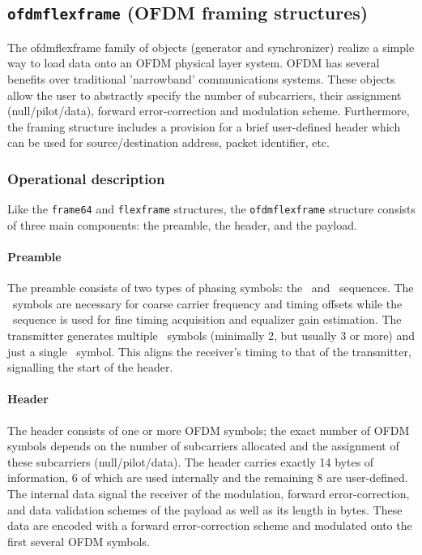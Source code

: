 % 
%
\subsection{{\tt ofdmflexframe} (OFDM framing structures)}
\label{module:framing:ofdmflexframe}

The ofdmflexframe family of objects (generator and synchronizer)
realize a simple way to load data onto an OFDM physical layer
system. OFDM has several benefits over traditional 'narrowband'
communications systems.
These objects allow the user to abstractly specify the number of
subcarriers, their assignment (null/pilot/data), forward
error-correction and modulation scheme.
Furthermore, the framing structure includes a provision for a brief
user-defined header which can be used for source/destination
address, packet identifier, etc.

\subsubsection{Operational description}
Like the {\tt frame64} and {\tt flexframe} structures,
the {\tt ofdmflexframe} structure consists of three main components:
the preamble, the header, and the payload.
    
\paragraph{Preamble}
    The preamble consists of two types of phasing symbols: the \Ss\ and
    \Sl\ sequences.
    The \Ss\ symbols are necessary for coarse carrier frequency
    and timing offsets while the \Sl\ sequence is used for fine timing
    acquisition and equalizer gain estimation.  The transmitter
    generates multiple \Ss\ symbols (minimally 2, but usually 3 or more)
    and just a single \Sl\ symbol. This aligns the receiver's timing to
    that of the transmitter, signalling the start of the header.

\paragraph{Header}
    The header consists of one or more OFDM symbols; the exact number of
    OFDM symbols depends on the number of subcarriers allocated and the
    assignment of these subcarriers (null/pilot/data). The header
    carries exactly 14 bytes of information, 6 of which are used
    internally and the remaining 8 are user-defined. The internal data
    signal the receiver of the modulation, forward error-correction, and
    data validation schemes of the payload as well as its length in
    bytes. These data are encoded with a forward error-correction scheme
    and modulated onto the first several OFDM symbols.

